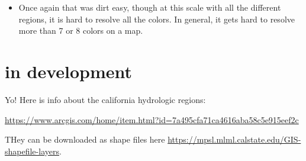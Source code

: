 \documentclass[]{book}
\providecommand{\tightlist}{%
  \setlength{\itemsep}{0pt}\setlength{\parskip}{0pt}}
\theoremstyle{definition}
\theoremstyle{definition}
\theoremstyle{remark}
\begin{document}
\begin{itemize}
\tightlist
\item
  Once again that was dirt easy, though at this scale with all the
  different regions, it is hard to resolve all the colors. In general,
  it gets hard to resolve more than 7 or 8 colors on a map.
\end{itemize}

\chapter{in development}\label{in-development}

Yo! Here is info about the california hydrologic regions:

\url{https://www.arcgis.com/home/item.html?id=7a495cfa71ca4616aba58c5e915eef2c}

THey can be downloaded as shape files here
\url{https://mpsl.mlml.calstate.edu/GIS-shapefile-layers}.


\end{document}
